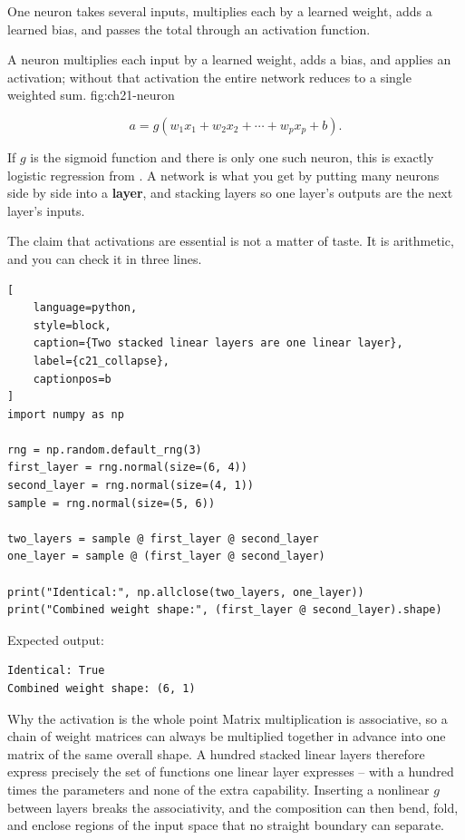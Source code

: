 
One neuron takes several inputs, multiplies each by a learned weight, adds a
learned bias, and passes the total through an activation function.

{A neuron multiplies each input by a learned weight, adds a bias, and applies an activation; without that activation the entire network reduces to a single weighted sum.}
{fig:ch21-neuron}

\[
a = g\!\left(w_1x_1 + w_2x_2 + \cdots + w_px_p + b\right).
\]

If $g$ is the sigmoid function and there is only one such neuron, this is exactly
logistic regression from . A network is what you get
by putting many neurons side by side into a \textbf{layer}, and stacking layers
so one layer's outputs are the next layer's inputs.


The claim that activations are essential is not a matter of taste. It is
arithmetic, and you can check it in three lines.

\begin{lstlisting}[
    language=python,
    style=block,
    caption={Two stacked linear layers are one linear layer},
    label={c21_collapse},
    captionpos=b
]
import numpy as np

rng = np.random.default_rng(3)
first_layer = rng.normal(size=(6, 4))
second_layer = rng.normal(size=(4, 1))
sample = rng.normal(size=(5, 6))

two_layers = sample @ first_layer @ second_layer
one_layer = sample @ (first_layer @ second_layer)

print("Identical:", np.allclose(two_layers, one_layer))
print("Combined weight shape:", (first_layer @ second_layer).shape)
\end{lstlisting}

Expected output:

\begin{lstlisting}[language=text, style=block, caption={Depth without nonlinearity is an illusion}, label={c21_collapse_output}, captionpos=b]
Identical: True
Combined weight shape: (6, 1)
\end{lstlisting}

\begin{ExplainBox}{Why the activation is the whole point}
Matrix multiplication is associative, so a chain of weight matrices can always
be multiplied together in advance into one matrix of the same overall shape. A
hundred stacked linear layers therefore express precisely the set of functions
one linear layer expresses -- with a hundred times the parameters and none of the
extra capability. Inserting a nonlinear $g$ between layers breaks the
associativity, and the composition can then bend, fold, and enclose regions of
the input space that no straight boundary can separate.
\end{ExplainBox}

